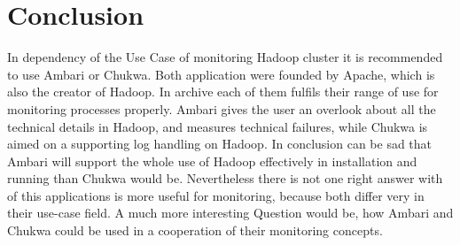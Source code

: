 \documentclass{acm_proc_article-sp}
\begin{document}
\section{Conclusion}
\label{sec:Conclusion}

In dependency of the Use Case of monitoring Hadoop cluster it is recommended to use Ambari or Chukwa. Both application were founded by Apache, which is also the creator of Hadoop. In archive each of them fulfils their range of use for monitoring processes properly. Ambari gives the user an overlook about all the technical details in Hadoop, and measures technical failures, while Chukwa is aimed on a supporting log handling on Hadoop. In conclusion can be sad that Ambari will support the whole use of Hadoop effectively in installation and running than Chukwa would be. Nevertheless there is not one right answer with of this applications is more useful for monitoring, because both differ very in their use-case field. A much more interesting Question would be, how Ambari and Chukwa could be used in a cooperation of their monitoring concepts.




\end{document}
